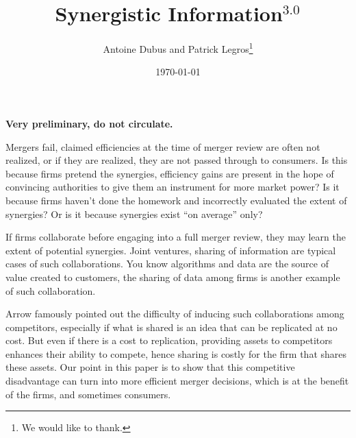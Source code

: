 \documentclass[a4paper,leqno]{article}%
\begin{document}
\title{Synergistic Information$^{3.0}$}
\author{Antoine Dubus and Patrick Legros\thanks{We would like to thank.}}
\date{\today}


\maketitle

 
\textbf{Very preliminary, do not circulate.}

\baselineskip0.7cm
Mergers fail, claimed efficiencies at the time of merger review are often not realized, or if they are realized, they are not passed through to consumers. Is this because firms pretend the synergies, efficiency gains are present in the hope of convincing authorities to give them an instrument for more market power? Is it because firms haven't done the homework and incorrectly evaluated the extent of synergies? Or is it because synergies exist ``on average'' only?

If firms collaborate before engaging into a full merger review, they may learn the extent of potential synergies. Joint ventures, sharing of information are typical cases of such collaborations. You know algorithms and data are the source of value created to customers, the sharing of data among firms is another example of such collaboration.

Arrow famously pointed out the difficulty of inducing such collaborations among competitors, especially if what is shared is an idea that can be replicated at no cost. But even if there is a cost to replication, providing assets to competitors enhances their ability to compete, hence sharing is costly for the firm that shares these assets. Our point in this paper is to show that this competitive disadvantage can turn into more efficient merger decisions, which is at the benefit of the firms, and sometimes consumers.
\end{document}
